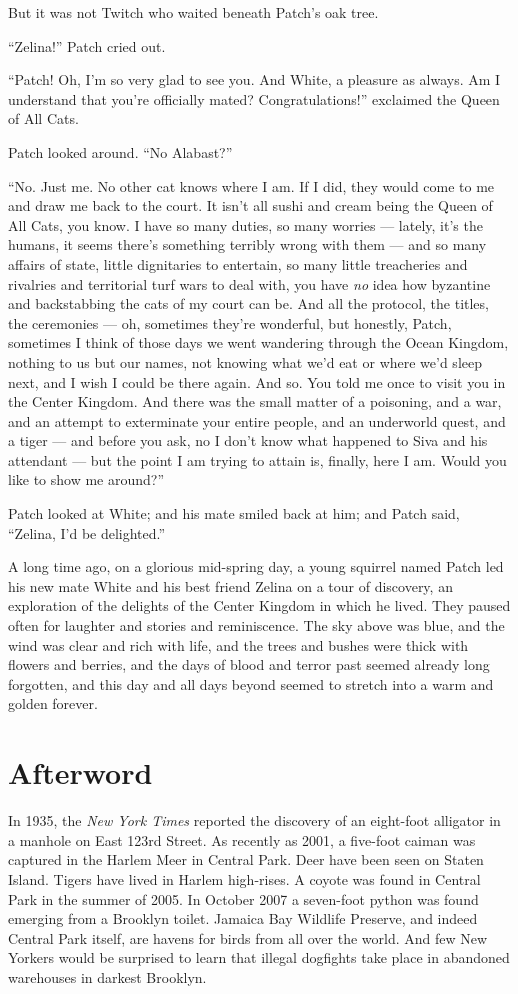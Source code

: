 \documentclass[ebook,oneside,openany,17pt]{memoir}
\renewcommand{\thechapter}{\Roman{chapter}}
\newcounter{sections}
\newcommand{\sections}[1]{%
  \section*{#1}
  \addtocounter{sections}{1}%
  \pdfbookmark[1]{#1}{section.\thechapter.\thesections}}
\begin{document}
But it was not Twitch who waited beneath Patch’s oak tree.

“Zelina!” Patch cried out.

“Patch! Oh, I’m so very glad to see you. And White, a pleasure as
always. Am I understand that you’re officially mated?
Congratulations!” exclaimed the Queen of All Cats.

Patch looked around. “No Alabast?”

“No. Just me. No other cat knows where I am. If I did, they would come
to me and draw me back to the court. It isn’t all sushi and cream
being the Queen of All Cats, you know. I have so many duties, so many
worries — lately, it’s the humans, it seems there’s something terribly
wrong with them — and so many affairs of state, little dignitaries to
entertain, so many little treacheries and rivalries and territorial
turf wars to deal with, you have \emph{no} idea how byzantine and
backstabbing the cats of my court can be. And all the protocol, the
titles, the ceremonies — oh, sometimes they’re wonderful, but
honestly, Patch, sometimes I think of those days we went wandering
through the Ocean Kingdom, nothing to us but our names, not knowing
what we’d eat or where we’d sleep next, and I wish I could be there
again. And so. You told me once to visit you in the Center
Kingdom. And there was the small matter of a poisoning, and a war, and
an attempt to exterminate your entire people, and an underworld quest,
and a tiger — and before you ask, no I don’t know what happened to
Siva and his attendant — but the point I am trying to attain is,
finally, here I am. Would you like to show me around?”

Patch looked at White; and his mate smiled back at him; and Patch
said, “Zelina, I’d be delighted.”

A long time ago, on a glorious mid-spring day, a young squirrel named
Patch led his new mate White and his best friend Zelina on a tour of
discovery, an exploration of the delights of the Center Kingdom in
which he lived. They paused often for laughter and stories and
reminiscence. The sky above was blue, and the wind was clear and rich
with life, and the trees and bushes were thick with flowers and
berries, and the days of blood and terror past seemed already long
forgotten, and this day and all days beyond seemed to stretch into a
warm and golden forever.


\sections{Afterword}

In 1935, the \emph{New York Times} reported the discovery of an
eight-foot alligator in a manhole on East 123rd Street. As recently as
2001, a five-foot caiman was captured in the Harlem Meer in Central
Park. Deer have been seen on Staten Island. Tigers have lived in
Harlem high-rises. A coyote was found in Central Park in the summer of
2005. In October 2007 a seven-foot python was found emerging from a
Brooklyn toilet. Jamaica Bay Wildlife Preserve, and indeed Central
Park itself, are havens for birds from all over the world. And few New
Yorkers would be surprised to learn that illegal dogfights take place
in abandoned warehouses in darkest Brooklyn.
\end{document}
